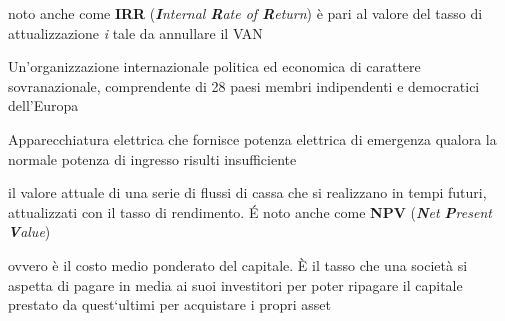 \begin{acronym}
\begin{multicols}{2}
		   {\newline \small noto anche come \textbf{IRR} (\textit{\textbf{I}nternal \textbf{R}ate of \textbf{R}eturn}) è pari al valore del tasso di attualizzazione \textit{i} tale da annullare il \ac{VAN} \par}		   

		   {\newline \small Un'organizzazione internazionale politica ed economica di carattere sovranazionale, comprendente di 28 paesi membri indipendenti e democratici dell'Europa\cite{paesiUE} \par}

		   {\newline \small Apparecchiatura elettrica che fornisce potenza elettrica di emergenza qualora la normale potenza di ingresso risulti insufficiente\par}
		   
		   {\newline \small il valore attuale di una serie di flussi di cassa che si realizzano in tempi futuri, attualizzati con il tasso di rendimento. \'E noto anche come \textbf{NPV} (\textit{\textbf{N}et \textbf{P}resent \textbf{V}alue}) \par}		   

		   {\newline \small ovvero è il costo medio ponderato del capitale. \`E il tasso che una società si aspetta di pagare in media ai suoi investitori per poter ripagare il capitale prestato da quest`ultimi per acquistare i propri asset \par}		
		   
\end{multicols}
\end{acronym}